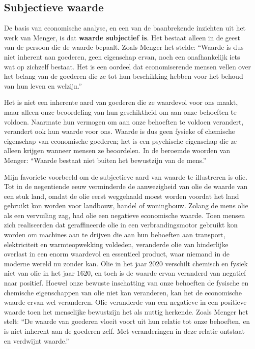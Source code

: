 \subsection{Subjectieve waarde}

De basis van economische analyse, en een van de baanbrekende inzichten uit het werk van Menger, is dat \textbf{waarde subjectief is}. Het bestaat alleen in de geest van de persoon die de waarde bepaalt. Zoals Menger het stelde: “Waarde is dus niet inherent aan goederen, geen eigenschap ervan, noch een onafhankelijk iets wat op zichzelf bestaat. Het is een oordeel dat economiserende mensen vellen over het belang van de goederen die ze tot hun beschikking hebben voor het behoud van hun leven en welzijn.”\autocite{17}

Het is niet een inherente aard van goederen die ze waardevol voor ons maakt, maar alleen onze beoordeling van hun geschiktheid om aan onze behoeften te voldoen. Naarmate hun vermogen om aan onze behoeften te voldoen verandert, verandert ook hun waarde voor ons. Waarde is dus geen fysieke of chemische eigenschap van economische goederen; het is een psychische eigenschap die ze alleen krijgen wanneer mensen ze beoordelen. In de beroemde woorden van Menger: “Waarde bestaat niet buiten het bewustzijn van de mens.”\autocite{18}

Mijn favoriete voorbeeld om de subjectieve aard van waarde te illustreren is olie. Tot in de negentiende eeuw verminderde de aanwezigheid van olie de waarde van een stuk land, omdat de olie eerst weggehaald moest worden voordat het land gebruikt kon worden voor landbouw, handel of woningbouw. Zolang de mens olie als een vervuiling zag, had olie een negatieve economische waarde. Toen mensen zich realiseerden dat geraffineerde olie in een verbrandingsmotor gebruikt kon worden om machines aan te drijven die aan hun behoeften aan transport, elektriciteit en warmteopwekking voldeden, veranderde olie van hinderlijke overlast in een enorm waardevol en essentieel product, waar niemand in de moderne wereld nu zonder kan. Olie in het jaar 2020 verschilt chemisch en fysiek niet van olie in het jaar 1620, en toch is de waarde ervan veranderd van negatief naar positief. Hoewel onze bewuste inschatting van onze behoeften de fysische en chemische eigenschappen van olie niet kan veranderen, kan het de economische waarde ervan wel veranderen. Olie veranderde van een negatieve in een positieve waarde toen het menselijke bewustzijn het als nuttig herkende. Zoals Menger het stelt: “De waarde van goederen vloeit voort uit hun relatie tot onze behoeften, en is niet inherent aan de goederen zelf. Met veranderingen in deze relatie ontstaat en verdwijnt waarde.”\autocite{19}

